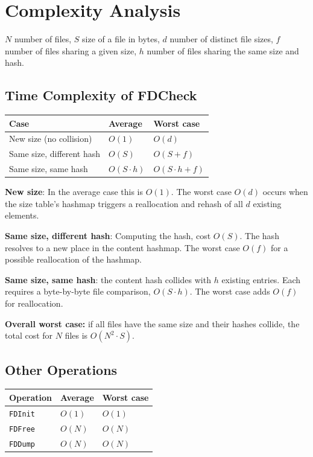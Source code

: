 \section{Complexity Analysis}

$N$ \- number of files,
$S$ \- size of a file in bytes,
$d$ \- number of distinct file sizes,
$f$ \- number of files sharing a given size,
$h$ \- number of files sharing the same size and hash.

\subsection{Time Complexity of FDCheck}

\begin{table}[h]
\centering
\begin{tabular}{lll}
\toprule
\textbf{Case} & \textbf{Average} & \textbf{Worst case} \\
\midrule
New size (no collision)     & $O(1)$         & $O(d)$ \\
Same size, different hash   & $O(S)$         & $O(S + f)$ \\
Same size, same hash        & $O(S \cdot h)$ & $O(S \cdot h + f)$ \\
\bottomrule
\end{tabular}
\end{table}

\textbf{New size}: In the average case this is $O(1)$. The worst case $O(d)$ occurs
when the size table's hashmap triggers a reallocation and rehash of all $d$ existing elements.

\textbf{Same size, different hash}: Computing the hash, cost $O(S)$. The hash resolves to a new place in the
content hashmap. The worst case $O(f)$ for a possible reallocation of the hashmap.

\textbf{Same size, same hash}: the content hash collides
with $h$ existing entries. Each requires a byte-by-byte file comparison, $O(S \cdot h)$.
The worst case adds $O(f)$ for reallocation.

\textbf{Overall worst case:} if all files have the same size and their hashes collide,
the total cost for $N$ files is $O(N^2 \cdot S)$.

\subsection{Other Operations}

\begin{table}[h]
\centering
\begin{tabular}{lll}
\toprule
\textbf{Operation} & \textbf{Average} & \textbf{Worst case} \\
\midrule
\texttt{FDInit}  & $O(1)$ & $O(1)$ \\
\texttt{FDFree}  & $O(N)$ & $O(N)$ \\
\texttt{FDDump}  & $O(N)$ & $O(N)$ \\
\bottomrule
\end{tabular}
\end{table}

